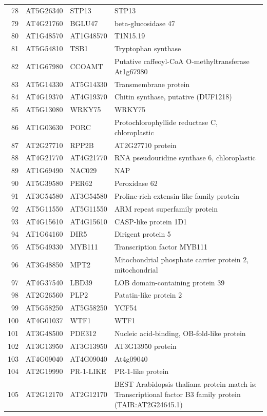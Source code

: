 \documentclass[11pt]{article}
\begin{document}
\begin{center}
\begin{tabular}{rlll}
78 & AT5G26340 & STP13 & STP13\\
79 & AT4G21760 & BGLU47 & beta-glucosidase 47\\
80 & AT1G48570 & AT1G48570 & T1N15.19\\
81 & AT5G54810 & TSB1 & Tryptophan synthase\\
82 & AT1G67980 & CCOAMT & Putative caffeoyl-CoA O-methyltransferase At1g67980\\
83 & AT5G14330 & AT5G14330 & Transmembrane protein\\
84 & AT4G19370 & AT4G19370 & Chitin synthase, putative (DUF1218)\\
85 & AT5G13080 & WRKY75 & WRKY75\\
86 & AT1G03630 & PORC & Protochlorophyllide reductase C, chloroplastic\\
87 & AT2G27710 & RPP2B & AT2G27710 protein\\
88 & AT4G21770 & AT4G21770 & RNA pseudouridine synthase 6, chloroplastic\\
89 & AT1G69490 & NAC029 & NAP\\
90 & AT5G39580 & PER62 & Peroxidase 62\\
91 & AT3G54580 & AT3G54580 & Proline-rich extensin-like family protein\\
92 & AT5G11550 & AT5G11550 & ARM repeat superfamily protein\\
93 & AT4G15610 & AT4G15610 & CASP-like protein 1D1\\
94 & AT1G64160 & DIR5 & Dirigent protein 5\\
95 & AT5G49330 & MYB111 & Transcription factor MYB111\\
96 & AT3G48850 & MPT2 & Mitochondrial phosphate carrier protein 2, mitochondrial\\
97 & AT4G37540 & LBD39 & LOB domain-containing protein 39\\
98 & AT2G26560 & PLP2 & Patatin-like protein 2\\
99 & AT5G58250 & AT5G58250 & YCF54\\
100 & AT4G01037 & WTF1 & WTF1\\
101 & AT3G48500 & PDE312 & Nucleic acid-binding, OB-fold-like protein\\
102 & AT3G13950 & AT3G13950 & AT3G13950 protein\\
103 & AT4G09040 & AT4G09040 & At4g09040\\
104 & AT2G19990 & PR-1-LIKE & PR-1-like protein\\
105 & AT2G12170 & AT2G12170 & BEST Arabidopsis thaliana protein match is: Transcriptional factor B3 family protein (TAIR:AT2G24645.1)\\

\end{tabular}
\end{center}
\end{document}
